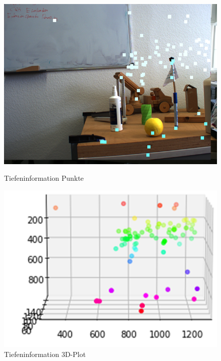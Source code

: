 \begin{figure}[!htb]
	\includegraphics[width=\linewidth]{bilder/depth_result}
	\caption{Tiefeninformation Punkte}\label{fig:awesome_image1}
	\endminipage\hfill
	\includegraphics[width=\linewidth]{bilder/depth_coord}
	\caption{Tiefeninformation 3D-Plot}\label{fig:awesome_image2}
	\endminipage\hfill
\end{figure}